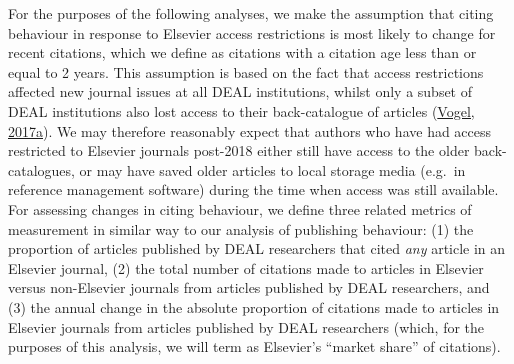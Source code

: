 \documentclass[
]{article}
\begin{document}
For the purposes of the following analyses, we make the assumption that citing behaviour in response to Elsevier access restrictions is most likely to change for recent citations, which we define as citations with a citation age less than or equal to 2 years. This assumption is based on the fact that access restrictions affected new journal issues at all DEAL institutions, whilst only a subset of DEAL institutions also lost access to their back-catalogue of articles (\href{https://doi.org/10.1126/science.355.6320.17}{Vogel, 2017a}). We may therefore reasonably expect that authors who have had access restricted to Elsevier journals post-2018 either still have access to the older back-catalogues, or may have saved older articles to local storage media (e.g.~in reference management software) during the time when access was still available. For assessing changes in citing behaviour, we define three related metrics of measurement in similar way to our analysis of publishing behaviour: (1) the proportion of articles published by DEAL researchers that cited \emph{any} article in an Elsevier journal, (2) the total number of citations made to articles in Elsevier versus non-Elsevier journals from articles published by DEAL researchers, and (3) the annual change in the absolute proportion of citations made to articles in Elsevier journals from articles published by DEAL researchers (which, for the purposes of this analysis, we will term as Elsevier's ``market share'' of citations).
\end{document}
